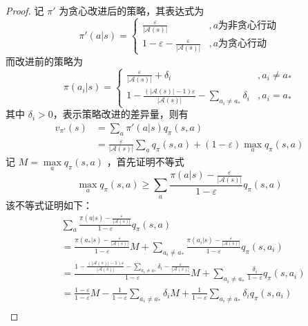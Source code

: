 \begin{proof}
    记 $\pi'$ 为贪心改进后的策略，其表达式为
    \begin{equation}
        \pi'(a|s)=
        \begin{cases}
            \frac{\varepsilon}{|\mathcal A(s)|}&, a\text{为非贪心行动}\\
            1-\varepsilon-\frac{\varepsilon}{|\mathcal A(s)|}&, a\text{为贪心行动}
        \end{cases}
    \end{equation}
    而改进前的策略为
    \begin{equation}
        \pi(a_i|s)=
\begin{cases}
\frac{\varepsilon}{|\mathcal A(s)|}+\delta_i&,a_i\neq a_*\\
1-\frac{(|\mathcal A(s)|-1)\varepsilon}{|\mathcal A(s)|}-\sum_{a_i\neq a_*}\delta_i&,a_i=a_*
\end{cases}
    \end{equation}
    其中 $\delta_i>0$，表示策略改进的差异量，则有
    \begin{equation}\label{eq:beforeineq}
        \begin{aligned}
            v_{\pi'}(s)&=\sum_a
            \pi'(a|s)q_\pi(s,a)\\
            &=\frac{\varepsilon}{|\mathcal A(s)|}\sum_aq_\pi(s,a)+(1-\varepsilon)\max\limits_aq_\pi(s,a)
            \end{aligned}
    \end{equation}
    记 $M=\max\limits_aq_\pi(s,a)$ ，首先证明不等式
    \begin{equation}\label{eq:ineq1}
        \displaystyle \max\limits_aq_\pi(s,a)\geq\sum_a\frac{\pi(a|s)-\frac{\varepsilon}{|\mathcal A(s)|}}{1-\varepsilon}q_\pi(s,a)
    \end{equation}
    该不等式证明如下：
    \[
        \begin{aligned}
            &\sum_a\frac{\pi(a|s)-\frac{\varepsilon}{|\mathcal A(s)|}}{1-\varepsilon}q_\pi(s,a)\\
            &=\frac{\pi(a_*|s)-\frac{\varepsilon}{|\mathcal A(s)|}}{1-\varepsilon}M+\sum_{a_i\neq a_*}\frac{\pi(a_i|s)-\frac{\varepsilon}{|\mathcal A(s)|}}{1-\varepsilon}q_\pi(s,a_i)\\
            &= \frac{1-\frac{(|\mathcal A(s)|-1)\varepsilon}{|\mathcal A(s)|}-\sum_{a_i\neq a_*}\delta_i-\frac{\varepsilon}{|\mathcal A(s)|}}{1-\varepsilon}M+\sum_{a_i\neq a_*}\frac{\delta_i}{1-\varepsilon}q_\pi(s,a_i)\\
            &=\frac{1-\varepsilon}{1-\varepsilon}M-\frac{1}{1-\varepsilon}\sum_{a_i\neq a_*}\delta_iM+\frac{1}{1-\varepsilon}\sum_{a_i\neq a_*}\delta_iq_\pi(s,a_i)\\

\end{aligned}\]
\end{proof}
